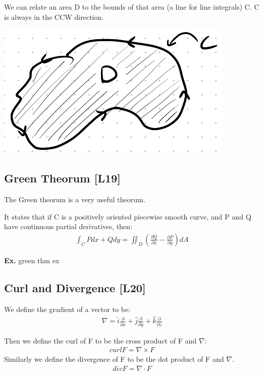 \documentclass[12pt,letterpaper]{article} \usepackage{amsmath} \usepackage{graphicx} \usepackage[margin=1in]{geometry} \usepackage{longtable}  \usepackage{amssymb}
\begin{document}
	We can relate an area D to the bounds of that area (a line for line integrals) C. C is always in the CCW direction. 
	\begin{center}
		\includegraphics[width=0.3\linewidth]{curve}
	\end{center}
	
	\subsection{Green Theorum [L19]}
	The Green theorum is a very useful theorum. 
	
	It states that if C is a positively oriented piecewise smooth curve, and P and Q have continuous partial derivatives, then:
	\begin{align*}
		\int_C Pdx + Qdy = \iint_D \left(\frac{\partial Q}{\partial x} - \frac{\partial P}{\partial y}\right)dA
	\end{align*}

	\begin{mdframed}[]
	\textbf{Ex. } green thm ex
	\end{mdframed}
	
	\subsection{Curl and Divergence [L20]}
	We define the gradient of a vector to be:
	\begin{align*}
		\nabla = \hat{i} \frac{\partial }{\partial x} + \hat{j} \frac{\partial }{\partial y} + \hat{k} \frac{\partial }{\partial z}
	\end{align*}

	Then we define the curl of F to be the cross product of F and $\nabla$:
	\begin{align*}
		curl F = \nabla \times F
	\end{align*}
	Similarly we define the divergence of F to be the dot product of F and $\nabla$.
	\begin{align*}
		div F = \nabla \cdot F
	\end{align*}
\end{document}
